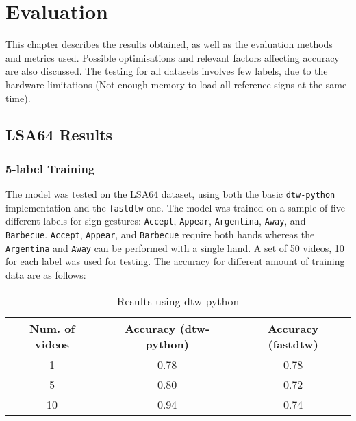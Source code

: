 \documentclass[final,rdr32.tex]{subfiles}
\begin{document}
\chapter{Evaluation}

This chapter describes the results obtained, as well as the evaluation methods and metrics used. Possible optimisations and relevant factors affecting accuracy are also discussed. The testing for all datasets involves few labels, due to the hardware limitations (Not enough memory to load all reference signs at the same time).

\section{LSA64 Results}

\subsection{5-label Training}

The model was tested on the LSA64 dataset, using both the basic \verb|dtw-python| implementation and the \verb|fastdtw| one. The model was trained on a sample of five different labels for sign gestures: \verb|Accept|, \verb|Appear|, \verb|Argentina|, \verb|Away|, and \verb|Barbecue|. \verb|Accept|, \verb|Appear|, and \verb|Barbecue| require both hands whereas the \verb|Argentina| and \verb|Away| can be performed with a single hand. A set of 50 videos, 10 for each label was used for testing. The accuracy for different amount of training data are as follows:

\begin{table}[!h]
    \begin{center}
        \begin{tabular}{ |c|c|c| }
            \hline
            Num. of videos & Accuracy (dtw-python) & Accuracy (fastdtw) \\
            \hline
            1              & 0.78                  & 0.78               \\
            5              & 0.80                  & 0.72               \\
            10             & 0.94                  & 0.74               \\
            \hline
        \end{tabular}
    \end{center}
    \caption{Results using dtw-python}
    \label{tab:accuracy}
\end{table}
\end{document}
